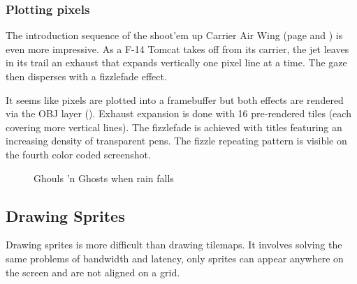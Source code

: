 \subsubsection{Plotting pixels}

The introduction sequence of the shoot'em up Carrier Air Wing (page \pageref{caw_color} and \pageref{caw_rgb}) is even more impressive. As a F-14 Tomcat takes off from its carrier, the jet leaves in its trail an exhaust that expands vertically one pixel line at a time. The gaze then disperses with a fizzlefade effect. 

It seems like pixels are plotted into a framebuffer but both effects are rendered via the OBJ layer (). Exhaust expansion is done with 16 pre-rendered tiles (each covering more vertical lines). The fizzlefade is achieved with titles featuring an increasing density of transparent pens. The fizzle repeating pattern is visible on the fourth color coded screenshot.


 

\vfill
\begin{figure}[!b]
 \caption*{Ghouls 'n Ghosts when rain falls}%
 \end{figure}%
\pagebreak

 \label{caw_color}





\pagebreak


 \label{caw_rgb}





\pagebreak

\subsection{Drawing Sprites}
Drawing sprites is more difficult than drawing tilemaps. It involves solving the same problems of bandwidth and latency, only sprites can appear anywhere on the screen and are not aligned on a grid.

